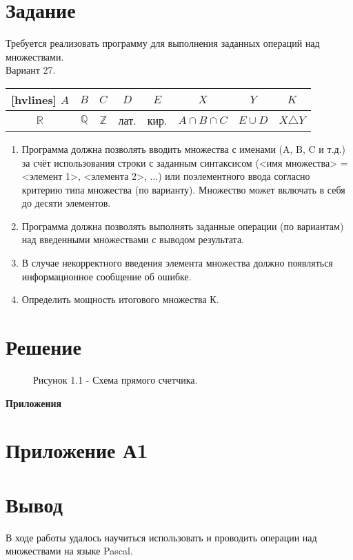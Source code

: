 \documentclass[oneside,a4paper,14pt]{extarticle}
\begin{document}
\section*{Задание}
Требуется реализовать программу для выполнения заданных операций над множествами.\\
Вариант 27.\\
\begin{center}
	\begin{NiceTabular}{|c|c|c|c|c|c|c|c|}[hvlines]
		\hline
		$A$          & $B$          & $C$          & $D$  & $E$  & $X$               & $Y$        & $K$             \\
		\hline
		$\mathbb{R}$ & $\mathbb{Q}$ & $\mathbb{Z}$ & лат. & кир. & $A \cap B \cap C$ & $E \cup D$ & $X \triangle Y$ \\
		\hline
	\end{NiceTabular}
\end{center}

\begin{enumerate}
	\item Программа должна позволять вводить множества с именами (A, B, C и т.д.) за счёт
	      использования строки с заданным синтаксисом (<имя множества> = {<элемент 1>, <элемента
	      2>, ...}) или поэлементного ввода согласно критерию типа множества (по варианту).
	      Множество может включать в себя до десяти элементов.
	\item Программа должна позволять выполнять заданные операции (по вариантам) над введенными
	      множествами с выводом результата.
	\item В случае некорректного введения элемента множества должно появляться информационное
	      сообщение об ошибке.
	\item Определить мощность итогового множества К.
\end{enumerate}

\section*{Решение}

\begin{figure}[h!]
	\centering
	\caption*{Рисунок 1.1 - Схема прямого счетчика.}
\end{figure}

\begin{flushright}
    \textcolor{black!30}{\textbf{Приложения}}
\end{flushright}
\section*{Приложение А1}

\newpage
\section*{Вывод}
В ходе работы удалось научиться использовать и проводить операции над множествами на языке Pascal.\\
\end{document}
